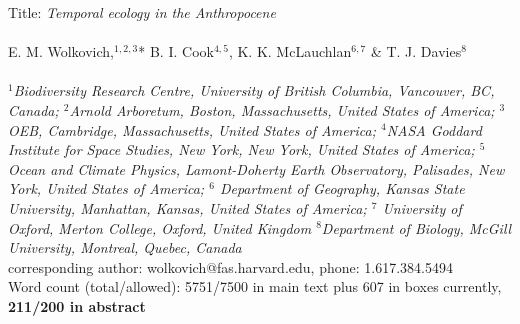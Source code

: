 \documentclass[11pt,a4paper,oneside]{article}
\begin{document}


\noindent Title: \emph{Temporal ecology in the Anthropocene}\\
\\
\noindent E. M. Wolkovich,$^{1,2,3}$* B. I. Cook$^{4,5}$, K. K. McLauchlan$^{6,7}$ \& T. J. Davies$^{8}$\\
\\
\noindent \emph{$^{1}$Biodiversity Research Centre, University of British Columbia, Vancouver, BC, Canada; $^{2}$Arnold Arboretum, Boston, Massachusetts, United States of America; $^{3}$OEB, Cambridge, Massachusetts, United States of America; $^{4}$NASA Goddard Institute for Space Studies, New York, New York, United States of America; $^{5}$Ocean and Climate  Physics, Lamont-Doherty Earth Observatory, Palisades, New York, United States of America; $^{6}$ Department of Geography, Kansas State University, Manhattan, Kansas, United States of America; $^{7}$ University of Oxford, Merton College, Oxford, United Kingdom $^{8}$Department of Biology, McGill University, Montreal, Quebec, Canada}\\ %

\noindent *corresponding author: wolkovich@fas.harvard.edu, phone: 1.617.384.5494\\

\noindent Word count (total/allowed): 5751/7500 in main text plus 607 in boxes currently, {\bf 211/200 in abstract} %

\end{document}

